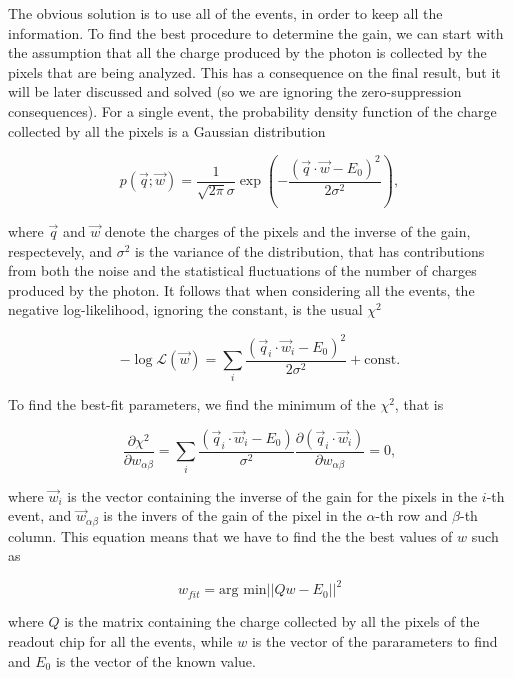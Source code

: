 The obvious solution is to use all of the events, in order to keep all the information. To find the best procedure to determine the gain, we can start with the assumption that all the charge produced by the photon is collected by the pixels that are being analyzed. This has a consequence on the final result, but it will be later discussed and solved (so we are ignoring the zero-suppression consequences). For a single event, the probability density function of the charge collected by all the pixels is a Gaussian distribution

\begin{equation}
p(\vec{q}; \vec{w}) = \frac{1}{\sqrt{2\pi}\sigma} \exp{\left(-\frac{(\vec{q}\cdot \vec{w} - E_0)^2}{2\sigma^2} \right) },
\end{equation}

where $\vec{q}$ and $\vec{w}$ denote the charges of the pixels and the inverse of the gain, respectevely, and $\sigma^2$ is the variance of the distribution, that has contributions from both the noise and the statistical fluctuations of the number of charges produced by the photon. It follows that when considering all the events, the negative log-likelihood, ignoring the constant, is the usual $\chi^2$

\begin{equation}
- \log \mathcal{L}(\vec{w}) = \sum_i \frac{(\vec{q}_i \cdot \vec{w}_i - E_0)^2}{2\sigma^2} + \textrm{const}.
\end{equation}

To find the best-fit parameters, we find the minimum of the $\chi^2$, that is


\begin{equation}
\frac{\partial \chi^2}{\partial w_{\alpha \beta}} = \sum_i \frac{(\vec{q}_i \cdot \vec{w}_i - E_0)}{\sigma^2} \frac{\partial(\vec{q}_i \cdot \vec{w}_i)}{\partial w_{\alpha \beta}} = 0,
\end{equation}

where $\vec{w}_i$ is the vector containing the inverse of the gain for the pixels in the $i$-th event, and $\vec{w}_{\alpha \beta}$ is the invers of the gain of the pixel in the $\alpha$-th row and $\beta$-th column. This equation means that we have to find the the best values of $w$ such as

\begin{equation}
w_{fit} = \textrm{arg min} ||Qw - E_0 ||^2
\end{equation}

where $Q$ is the matrix containing the charge collected by all the pixels of the readout chip for all the events, while $w$ is the vector of the pararameters to find and $E_0$ is the vector of the known value.

